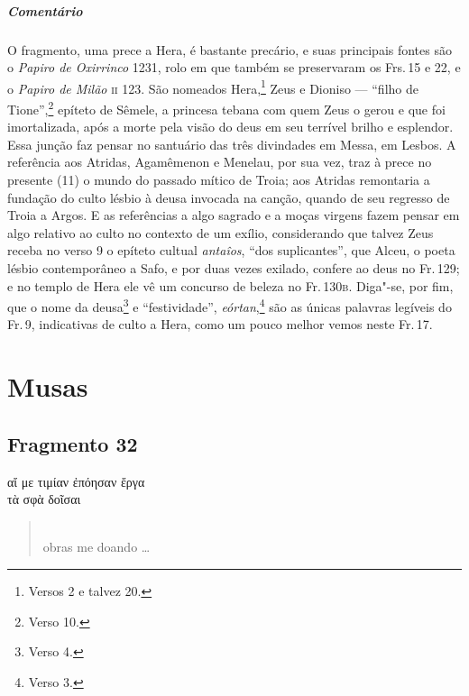 {\paragraph{Comentário} O fragmento, uma prece a Hera, é bastante precário, e suas principais fontes são o \emph{Papiro de Oxirrinco} 1231, rolo em que também se preservaram os Frs.\,15 e 22, e o \emph{Papiro de Milão} \textsc{ii} 123. São nomeados Hera,\footnote{Versos 2 e talvez 20.} Zeus e Dioniso --- ``filho de Tione'',\footnote{Verso 10.} epíteto de Sêmele, a princesa tebana com quem Zeus o gerou e que foi imortalizada, após a morte pela visão do deus em seu terrível brilho e esplendor. Essa junção faz pensar no santuário das três divindades em Messa, em Lesbos. A referência aos Atridas, Agamêmenon e Menelau, por sua vez, traz à prece no presente (11) o mundo do passado mítico de Troia; aos Atridas remontaria a fundação do culto lésbio à deusa invocada na canção, quando de seu regresso de Troia a Argos. E as referências a algo sagrado e a moças virgens
fazem pensar em algo relativo ao culto no contexto de um exílio, considerando que talvez Zeus receba no verso 9 o epíteto cultual \emph{antaîos}, ``dos suplicantes'', que Alceu, o poeta lésbio contemporâneo a Safo, e por duas vezes exilado, confere ao deus no Fr.\,129; e no templo de Hera ele vê um concurso de beleza no Fr.\,130\textsc{b}. Diga"-se, por fim, que o nome da deusa\footnote{Verso 4.} e ``festividade'', \emph{eórtan},\footnote{Verso 3.} são as únicas palavras legíveis do Fr.\,9, indicativas de culto a Hera, como um pouco melhor vemos neste Fr.\,17.}



\chapter{Musas}

\section{Fragmento 32}

\begin{gkverse}
αἴ με τιμίαν ἐπόησαν ἔργα\\
τὰ σφὰ δοῖσαι
\end{gkverse}

\begin{verse}
\\
obras me doando \ldots{}
\end{verse}

